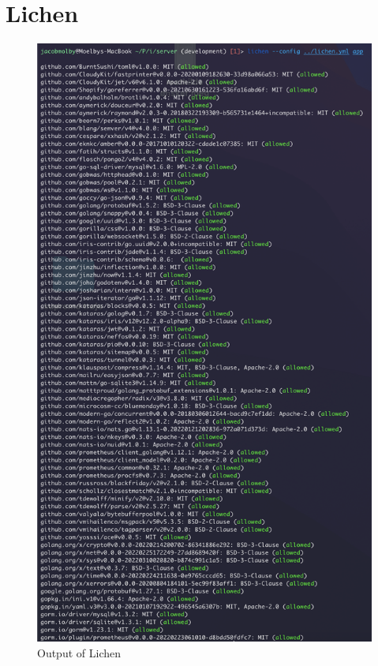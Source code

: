 \documentclass{article}
\begin{document}
\section{Lichen}
\label{appendix:lichen-output}
\begin{figure}[H]
   \centering
   \includegraphics[height=0.85\textheight,keepaspectratio]{lichen.png}
   \caption{Output of Lichen}
   
\end{figure}
\end{document}
